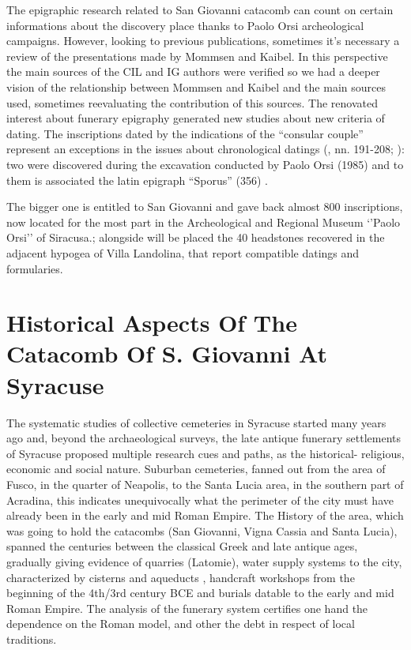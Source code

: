 \documentclass[amsthm,ebook]{saparticle}
\begin{document}
The epigraphic research related to San Giovanni catacomb can count on certain informations about the discovery place thanks to Paolo Orsi archeological campaigns. However, looking to previous publications, sometimes it’s necessary a review of the presentations made by Mommsen and Kaibel. In this perspective the main sources of the CIL and IG authors were verified so we had a deeper vision of the relationship between Mommsen and Kaibel and the main sources used, sometimes reevaluating the contribution of this sources. The renovated interest about funerary epigraphy generated new studies about new criteria of dating. The inscriptions dated by the indications of the ``consular couple'' represent an exceptions in the issues about chronological datings (\citealp{FERRUA1947}, nn. 191-208; \citeyear[nn. 191-208]{FERRUA1989}): two were discovered during the excavation conducted by Paolo Orsi (1985) and to them is associated the latin epigraph ``Sporus'' (356) .

The bigger one is entitled to San Giovanni and gave back almost 800 inscriptions, now located for the most part in the Archeological and Regional Museum ‘’Paolo Orsi’’ of Siracusa.; alongside will be placed the 40 headstones recovered in the adjacent hypogea of Villa Landolina, that report compatible datings and formularies.
 
\section{Historical Aspects Of The Catacomb Of S. Giovanni At Syracuse}

\noindent The systematic studies of collective cemeteries in Syracuse started many years ago and, beyond the archaeological surveys, the late antique funerary settlements of Syracuse proposed multiple research cues and paths, as the historical- religious, economic and social nature.
Suburban cemeteries, fanned out from the area of Fusco, in the quarter of Neapolis, to the Santa Lucia area, in the southern part of Acradina, this indicates unequivocally what the perimeter of the city must have already been in the early and mid Roman Empire. The History of the area, which was going to hold the catacombs (San Giovanni, Vigna Cassia and Santa Lucia), spanned the centuries between the classical Greek and late antique ages, gradually giving evidence of quarries (Latomie), water supply systems to the city, characterized by cisterns and aqueducts \citep[682]{COLLINBOUFFIER1987}, handcraft workshops from the beginning of the 4th/3rd century BCE and burials datable to the early and mid Roman Empire. The analysis of the funerary system certifies one hand the dependence on the Roman model, and other the debt in respect of local traditions.
\end{document}
